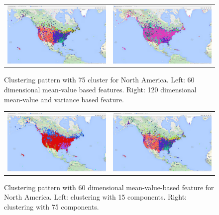 \begin{figure}[H]
    \centering
    \begin{tabular}{c c}
        \includegraphics[width=.4\linewidth]{./figure/Ave_60_comp_75_clu_USA.png}
        & \includegraphics[width=.4\linewidth]{./figure/Var_120_comp_75_clu_USA.png}
    \end{tabular}
    \caption{Clustering pattern with 75 cluster for North America. Left: 60 dimensional mean-value based features. Right: 120 dimensional mean-value and variance based feature.}
    \label{fig:VarFeature}
\end{figure}
\begin{figure}[H]
    \centering
    \begin{tabular}{c c}
        \includegraphics[width=.4\linewidth]{./figure/Ave_60_comp_15_clu_USA.png}
        & \includegraphics[width=.4\linewidth]{./figure/Ave_60_comp_75_clu_USA.png}
    \end{tabular}
    \caption{Clustering pattern with 60 dimensional mean-value-based feature for North America. Left: clustering with 15 components. Right: clustering with 75 components.}
    \label{fig:CluNum}
\end{figure}
